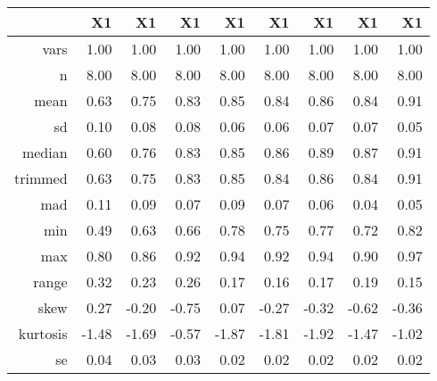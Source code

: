 \begin{table}[ht]
\centering
\begin{tabular}{rrrrrrrrr}
  \hline
 & X1 & X1 & X1 & X1 & X1 & X1 & X1 & X1 \\ 
  \hline
vars & 1.00 & 1.00 & 1.00 & 1.00 & 1.00 & 1.00 & 1.00 & 1.00 \\ 
  n & 8.00 & 8.00 & 8.00 & 8.00 & 8.00 & 8.00 & 8.00 & 8.00 \\ 
  mean & 0.63 & 0.75 & 0.83 & 0.85 & 0.84 & 0.86 & 0.84 & 0.91 \\ 
  sd & 0.10 & 0.08 & 0.08 & 0.06 & 0.06 & 0.07 & 0.07 & 0.05 \\ 
  median & 0.60 & 0.76 & 0.83 & 0.85 & 0.86 & 0.89 & 0.87 & 0.91 \\ 
  trimmed & 0.63 & 0.75 & 0.83 & 0.85 & 0.84 & 0.86 & 0.84 & 0.91 \\ 
  mad & 0.11 & 0.09 & 0.07 & 0.09 & 0.07 & 0.06 & 0.04 & 0.05 \\ 
  min & 0.49 & 0.63 & 0.66 & 0.78 & 0.75 & 0.77 & 0.72 & 0.82 \\ 
  max & 0.80 & 0.86 & 0.92 & 0.94 & 0.92 & 0.94 & 0.90 & 0.97 \\ 
  range & 0.32 & 0.23 & 0.26 & 0.17 & 0.16 & 0.17 & 0.19 & 0.15 \\ 
  skew & 0.27 & -0.20 & -0.75 & 0.07 & -0.27 & -0.32 & -0.62 & -0.36 \\ 
  kurtosis & -1.48 & -1.69 & -0.57 & -1.87 & -1.81 & -1.92 & -1.47 & -1.02 \\ 
  se & 0.04 & 0.03 & 0.03 & 0.02 & 0.02 & 0.02 & 0.02 & 0.02 \\ 
   \hline
\end{tabular}
\end{table}
